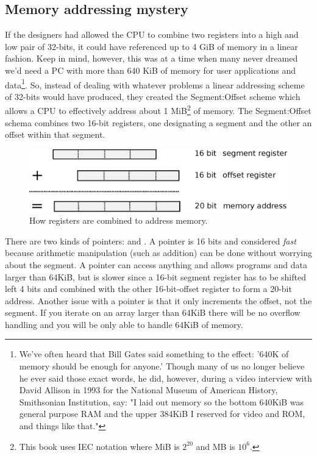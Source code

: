 \documentclass[book.tex]{subfiles}
\begin{document}
\subsection{Memory addressing mystery}
If the designers had allowed the CPU to combine two registers into a high and low pair of 32-bits, it could have referenced up to 4 GiB of memory in a linear fashion. Keep in mind, however, this was at a time when many never dreamed we'd need a PC with more than 640 KiB of memory for user applications and data\footnote{We've often heard that Bill Gates said something to the effect: '640K of memory should be enough for anyone.' Though many of us no longer believe he ever said those exact words, he did, however, during a video interview with David Allison in 1993 for the National Museum of American History, Smithsonian Institution, say: "I laid out memory so the bottom 640KiB was general purpose RAM and the upper 384KiB I reserved for video and ROM, and things like that."}. So, instead of dealing with whatever problems a linear addressing scheme of 32-bits would have produced, they created the Segment:Offset scheme 
which allows a CPU to effectively address about 1 MiB\footnote{This book uses IEC notation where MiB is $2^{20}$ and MB is $10^6$.} of memory. The Segment:Offset schema combines two 16-bit registers, one designating a segment and the other an offset within that segment.
\\

\par
\begin{figure}[H]
\centering
\includegraphics[width=\textwidth]{imgs/drawings/register_combination_20_bits_address.eps}
\caption{How registers are combined to address memory.}
\label{fig:register_comb_to_20_bits}
\end{figure}
\par

There are two kinds of pointers:  and . A  pointer is 16 bits and considered \emph{fast} because arithmetic manipulation (such as addition) can be done without worrying about the segment. A  pointer can access anything and allows programs and data larger than 64KiB, but is slower since a 16-bit segment register has to be shifted left 4 bits and combined with the other 16-bit-offset register to form a 20-bit address. Another issue with a  pointer is that it only increments the offset, not the segment. If you iterate on an array larger than 64KiB there will be no overflow handling and you will be only able to handle 64KiB of memory.\\
\end{document}
